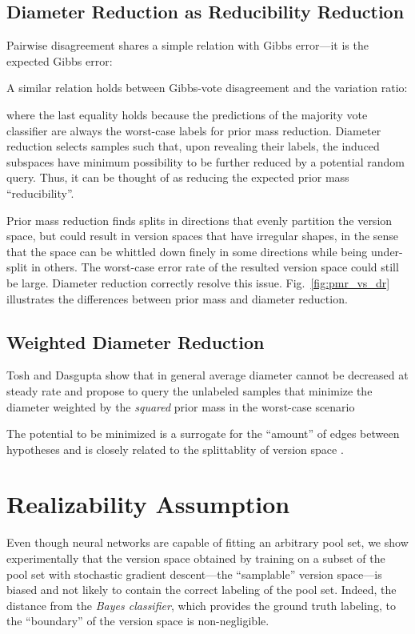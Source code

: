 \documentclass[runningheads, envcountsame, a4paper]{llncs}
\begin{document}
\subsection{Diameter Reduction as Reducibility Reduction}
\label{sec:diameter_reduction_as_reducibility_reduction}
Pairwise disagreement shares a simple relation with Gibbs error---it is the expected Gibbs error:

A similar relation holds between Gibbs-vote disagreement and the variation ratio:

where the last equality holds because the predictions of the majority vote classifier are always the worst-case labels for prior mass reduction. Diameter reduction selects samples such that, upon revealing their labels, the induced subspaces have minimum possibility to be further reduced by a potential random query. Thus, it can be thought of as reducing the expected prior mass ``reducibility''. 

Prior mass reduction finds splits in directions that evenly partition the version space, but could result in version spaces that have irregular shapes, in the sense that the space can be whittled down finely in some directions while being under-split in others. The worst-case error rate of the resulted version space could still be large. Diameter reduction correctly resolve this issue. Fig.~\ref{fig:pmr_vs_dr} illustrates the differences between prior mass and diameter reduction.


\subsection{Weighted Diameter Reduction}
\label{sec:weighted_diameter_reduction}

Tosh and Dasgupta \cite{Tosh17} show that in general average diameter cannot be decreased at steady rate and propose to query the unlabeled samples that minimize the diameter weighted by the \textit{squared} prior mass in the worst-case scenario

The potential to be minimized is a surrogate for the ``amount'' of edges between hypotheses and is closely related to the splittablity of version space \cite{Tosh17,Dasgupta06}. 


\section{Realizability Assumption}
\label{sec:realizability_assumption}

Even though neural networks are capable of fitting an arbitrary pool set, we show experimentally that the version space obtained by training on a subset of the pool set with stochastic gradient descent---the ``samplable'' version space---is biased and not likely to contain the correct labeling of the pool set. Indeed, the distance from the \textit{Bayes classifier}, which provides the ground truth labeling, to the ``boundary'' of the version space is non-negligible.
\end{document}
